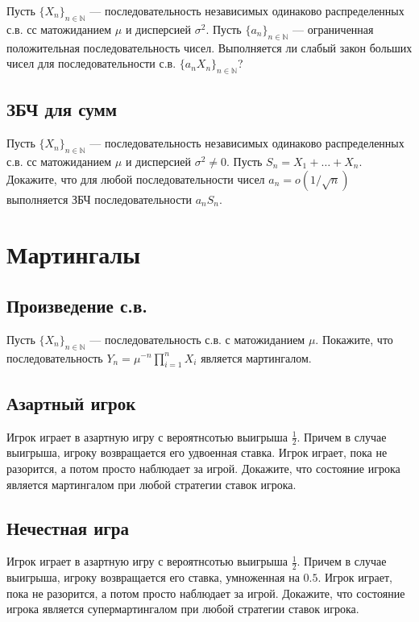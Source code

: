 \documentclass[12pt]{article}
\newcommand\N{\mathbb{N}}
\begin{document}
Пусть $\{X_n\}_{n \in \N}$ --- последовательность независимых одинаково распределенных с.в. сс матожиданием $\mu$ и дисперсией $\sigma^2$. Пусть $\{a_n\}_{n \in \N}$ --- ограниченная положительная последовательность чисел. Выполняется ли слабый закон больших чисел для последовательности с.в. $\{a_n X_n\}_{n \in \N}$?

\subsection{ЗБЧ для сумм}
Пусть $\{X_n\}_{n \in \N}$ --- последовательность независимых одинаково распределенных с.в. сс матожиданием $\mu$ и дисперсией $\sigma^2 \ne 0$. Пусть $S_n = X_1 + \dots + X_n$. Докажите, что для любой последовательности чисел $a_n = o(1/\sqrt{n})$ выполняется ЗБЧ последовательности $a_n S_n$.

\section{Мартингалы}

\subsection{Произведение с.в.}

Пусть $\{X_n\}_{n \in \N}$ --- последовательность с.в. с матожиданием $\mu$. Покажите, что последовательность $Y_n = \mu^{-n} \prod_{i = 1}^n X_i$ является мартингалом.

\subsection{Азартный игрок}

Игрок играет в азартную игру с вероятнсотью выигрыша $\frac{1}{2}$. Причем в случае выигрыша, игроку возвращается его удвоенная ставка. Игрок играет, пока не разорится, а потом просто наблюдает за игрой. Докажите, что состояние игрока является мартингалом при любой стратегии ставок игрока.

\subsection{Нечестная игра}

Игрок играет в азартную игру с вероятнсотью выигрыша $\frac{1}{2}$. Причем в случае выигрыша, игроку возвращается его ставка, умноженная на $0.5$. Игрок играет, пока не разорится, а потом просто наблюдает за игрой. Докажите, что состояние игрока является супермартингалом при любой стратегии ставок игрока.
\end{document}
